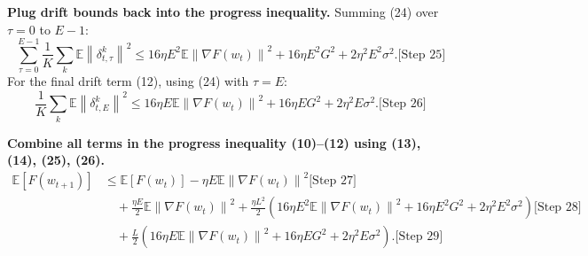 \documentclass{article}
\newcommand{\norm}[1]{\left\| #1 \right\|}
\newcommand{\step}[1]{\text{[Step #1]}}
\begin{document}
\step{10} \textbf{Plug drift bounds back into the progress inequality.}
Summing (24) over $\tau=0$ to $E-1$:
\begin{equation}
    \sum_{\tau=0}^{E-1} \frac{1}{K}\sum_k \mathbb{E}\norm{\delta_{t,\tau}^k}^2 \le 16\eta E^2 \mathbb{E}\norm{\nabla F(w_t)}^2 + 16\eta E^2 G^2 + 2\eta^2 E^2 \sigma^2. \step{25}
\end{equation}
For the final drift term (12), using (24) with $\tau=E$:
\begin{equation}
    \frac{1}{K}\sum_k \mathbb{E}\norm{\delta_{t,E}^k}^2 \le 16\eta E \mathbb{E}\norm{\nabla F(w_t)}^2 + 16\eta E G^2 + 2\eta^2 E \sigma^2. \step{26}
\end{equation}

\step{11} \textbf{Combine all terms in the progress inequality (10)--(12) using (13), (14), (25), (26).}
\begin{align}
\mathbb{E}[F(w_{t+1})] &\le \mathbb{E}[F(w_t)] - \eta E \mathbb{E}\norm{\nabla F(w_t)}^2 \step{27} \\
&\quad + \frac{\eta E}{2} \mathbb{E}\norm{\nabla F(w_t)}^2 + \frac{\eta L^2}{2} \left( 16\eta E^2 \mathbb{E}\norm{\nabla F(w_t)}^2 + 16\eta E^2 G^2 + 2\eta^2 E^2 \sigma^2 \right) \step{28} \\
&\quad + \frac{L}{2} \left( 16\eta E \mathbb{E}\norm{\nabla F(w_t)}^2 + 16\eta E G^2 + 2\eta^2 E \sigma^2 \right). \step{29}
\end{align}
\end{document}
